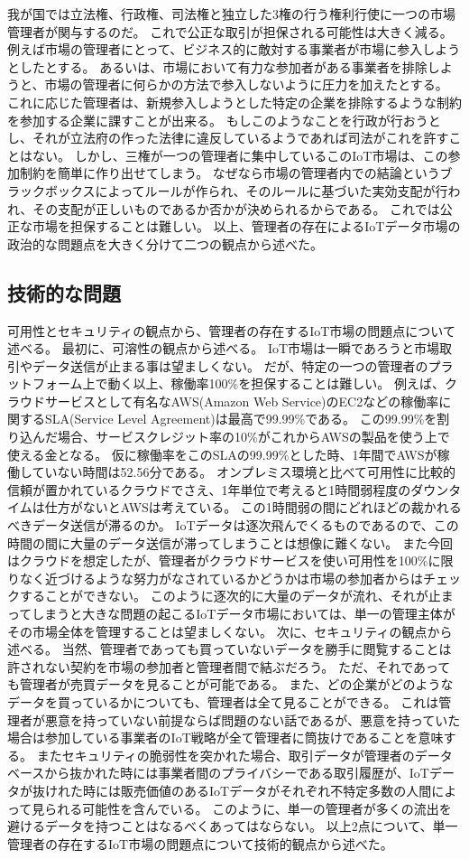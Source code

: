 我が国では立法権、行政権、司法権と独立した3権の行う権利行使に一つの市場管理者が関与するのだ。
これで公正な取引が担保される可能性は大きく減る。
例えば市場の管理者にとって、ビジネス的に敵対する事業者が市場に参入しようとしたとする。
あるいは、市場において有力な参加者がある事業者を排除しようと、市場の管理者に何らかの方法で参入しないように圧力を加えたとする。
これに応じた管理者は、新規参入しようとした特定の企業を排除するような制約を参加する企業に課すことが出来る。
もしこのようなことを行政が行おうとし、それが立法府の作った法律に違反しているようであれば司法がこれを許すことはない。
しかし、三権が一つの管理者に集中しているこのIoT市場は、この参加制約を簡単に作り出せてしまう。
なぜなら市場の管理者内での結論というブラックボックスによってルールが作られ、そのルールに基づいた実効支配が行われ、その支配が正しいものであるか否かが決められるからである。
これでは公正な市場を担保することは難しい。
以上、管理者の存在によるIoTデータ市場の政治的な問題点を大きく分けて二つの観点から述べた。

\subsection{技術的な問題}
可用性とセキュリティの観点から、管理者の存在するIoT市場の問題点について述べる。
最初に、可溶性の観点から述べる。
IoT市場は一瞬であろうと市場取引やデータ送信が止まる事は望ましくない。
だが、特定の一つの管理者のプラットフォーム上で動く以上、稼働率100\%を担保することは難しい。
例えば、クラウドサービスとして有名なAWS(Amazon Web Service)のEC2などの稼働率に関するSLA(Service Level Agreement)は最高で99.99\%である。
この99.99\%を割り込んだ場合、サービスクレジット率の10\%がこれからAWSの製品を使う上で使える金となる。
仮に稼働率をこのSLAの99.99\%とした時、1年間でAWSが稼働していない時間は52.56分である。
オンプレミス環境と比べて可用性に比較的信頼が置かれているクラウドでさえ、1年単位で考えると1時間弱程度のダウンタイムは仕方がないとAWSは考えている。
この1時間弱の間にどれほどの裁かれるべきデータ送信が滞るのか。
IoTデータは逐次飛んでくるものであるので、この時間の間に大量のデータ送信が滞ってしまうことは想像に難くない。
また今回はクラウドを想定したが、管理者がクラウドサービスを使い可用性を100\%に限りなく近づけるような努力がなされているかどうかは市場の参加者からはチェックすることができない。
このように逐次的に大量のデータが流れ、それが止まってしまうと大きな問題の起こるIoTデータ市場においては、単一の管理主体がその市場全体を管理することは望ましくない。
次に、セキュリティの観点から述べる。
当然、管理者であっても買っていないデータを勝手に閲覧することは許されない契約を市場の参加者と管理者間で結ぶだろう。
ただ、それであっても管理者が売買データを見ることが可能である。
また、どの企業がどのようなデータを買っているかについても、管理者は全て見ることができる。
これは管理者が悪意を持っていない前提ならば問題のない話であるが、悪意を持っていた場合は参加している事業者のIoT戦略が全て管理者に筒抜けであることを意味する。
またセキュリティの脆弱性を突かれた場合、取引データが管理者のデータベースから抜かれた時には事業者間のプライバシーである取引履歴が、IoTデータが抜けれた時には販売価値のあるIoTデータがそれぞれ不特定多数の人間によって見られる可能性を含んでいる。
このように、単一の管理者が多くの流出を避けるデータを持つことはなるべくあってはならない。
以上2点について、単一管理者の存在するIoT市場の問題点について技術的観点から述べた。

